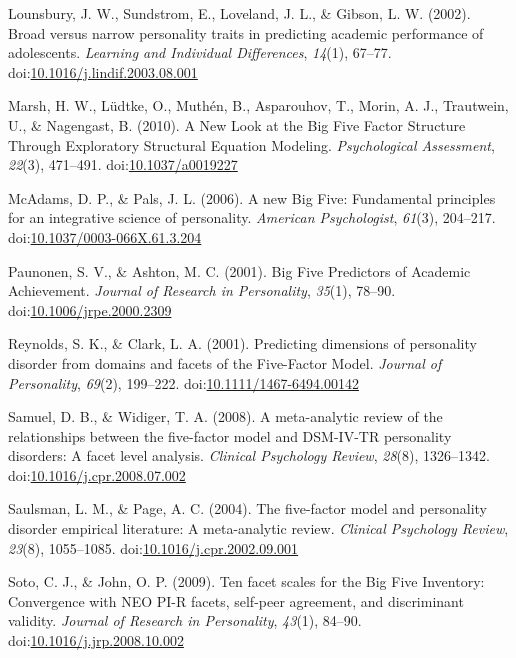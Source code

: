 \documentclass[,man,floatsintext]{apa6}
\theoremstyle{definition}
\theoremstyle{definition}
\theoremstyle{definition}
\theoremstyle{remark}
\begin{document}
\leavevmode\hypertarget{ref-Lounsbury2002}{}%
Lounsbury, J. W., Sundstrom, E., Loveland, J. L., \& Gibson, L. W.
(2002). Broad versus narrow personality traits in predicting academic
performance of adolescents. \emph{Learning and Individual Differences},
\emph{14}(1), 67--77.
doi:\href{https://doi.org/10.1016/j.lindif.2003.08.001}{10.1016/j.lindif.2003.08.001}

\leavevmode\hypertarget{ref-Marsh2010}{}%
Marsh, H. W., Lüdtke, O., Muthén, B., Asparouhov, T., Morin, A. J.,
Trautwein, U., \& Nagengast, B. (2010). A New Look at the Big Five
Factor Structure Through Exploratory Structural Equation Modeling.
\emph{Psychological Assessment}, \emph{22}(3), 471--491.
doi:\href{https://doi.org/10.1037/a0019227}{10.1037/a0019227}

\leavevmode\hypertarget{ref-McAdams2006a}{}%
McAdams, D. P., \& Pals, J. L. (2006). A new Big Five: Fundamental
principles for an integrative science of personality. \emph{American
Psychologist}, \emph{61}(3), 204--217.
doi:\href{https://doi.org/10.1037/0003-066X.61.3.204}{10.1037/0003-066X.61.3.204}

\leavevmode\hypertarget{ref-Paunonen2001}{}%
Paunonen, S. V., \& Ashton, M. C. (2001). Big Five Predictors of
Academic Achievement. \emph{Journal of Research in Personality},
\emph{35}(1), 78--90.
doi:\href{https://doi.org/10.1006/jrpe.2000.2309}{10.1006/jrpe.2000.2309}

\leavevmode\hypertarget{ref-ClarkReynolds2001}{}%
Reynolds, S. K., \& Clark, L. A. (2001). Predicting dimensions of
personality disorder from domains and facets of the Five-Factor Model.
\emph{Journal of Personality}, \emph{69}(2), 199--222.
doi:\href{https://doi.org/10.1111/1467-6494.00142}{10.1111/1467-6494.00142}

\leavevmode\hypertarget{ref-SamuelWidiger2008}{}%
Samuel, D. B., \& Widiger, T. A. (2008). A meta-analytic review of the
relationships between the five-factor model and DSM-IV-TR personality
disorders: A facet level analysis. \emph{Clinical Psychology Review},
\emph{28}(8), 1326--1342.
doi:\href{https://doi.org/10.1016/j.cpr.2008.07.002}{10.1016/j.cpr.2008.07.002}

\leavevmode\hypertarget{ref-SaulsmanPage2004}{}%
Saulsman, L. M., \& Page, A. C. (2004). The five-factor model and
personality disorder empirical literature: A meta-analytic review.
\emph{Clinical Psychology Review}, \emph{23}(8), 1055--1085.
doi:\href{https://doi.org/10.1016/j.cpr.2002.09.001}{10.1016/j.cpr.2002.09.001}

\leavevmode\hypertarget{ref-SotoJohn2009}{}%
Soto, C. J., \& John, O. P. (2009). Ten facet scales for the Big Five
Inventory: Convergence with NEO PI-R facets, self-peer agreement, and
discriminant validity. \emph{Journal of Research in Personality},
\emph{43}(1), 84--90.
doi:\href{https://doi.org/10.1016/j.jrp.2008.10.002}{10.1016/j.jrp.2008.10.002}
\end{document}
